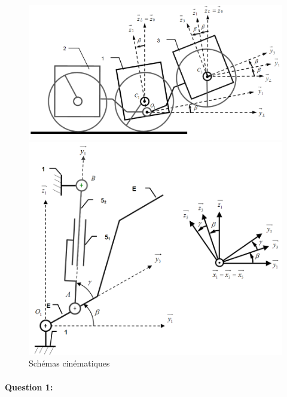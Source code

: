 \begin{figure}[htbp]
\begin{minipage}[c]{.48\linewidth}
\begin{center}
\includegraphics[width=\linewidth]{img/Robot-cin1.png}
\end{center}
\end{minipage}
\hfill
\begin{minipage}[c]{.48\linewidth}
\begin{center}
\includegraphics[width=\linewidth]{img/Robot-cin2.png}
\end{center}
\end{minipage}
\caption{Schémas cinématiques}
\label{fig:image145}
\end{figure}

\paragraph{Question 1:}

